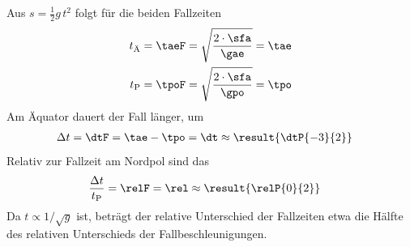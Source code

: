 Aus $s = \frac{1}{2}g\,t^2$ folgt für die beiden Fallzeiten
\begin{align}
 t_\text{Ä} &= \taeF = \sqrt{\frac{2\cdot\sfa}{\gae}} = \tae \\
 t_\text{P} &= \tpoF = \sqrt{\frac{2\cdot\sfa}{\gpo}} = \tpo
\end{align}
Am Äquator dauert der Fall länger, um
\begin{align}
 \Delta t &= \dtF = \tae - \tpo = \dt \approx \result{\dtP{-3}{2}}
\end{align}
Relativ zur Fallzeit am Nordpol sind das
\begin{align}
 \frac{\Delta t}{t_\text{P}} &= \relF = \rel \approx \result{\relP{0}{2}}
\end{align}
Da $t \propto 1/\sqrt{g}$ ist, beträgt der relative Unterschied der Fallzeiten etwa die Hälfte des relativen Unterschieds der Fallbeschleunigungen.
